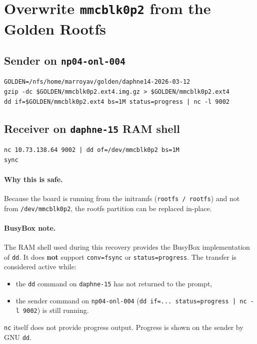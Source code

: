 \documentclass[a4paper,11pt]{article}
\begin{document}
\clearpage
\section{Overwrite \texttt{mmcblk0p2} from the Golden Rootfs}

\subsection*{Sender on \texttt{np04-onl-004}}
\begin{listing}[H]
\begin{verbatim}
GOLDEN=/nfs/home/marroyav/golden/daphne14-2026-03-12
gzip -dc $GOLDEN/mmcblk0p2.ext4.img.gz > $GOLDEN/mmcblk0p2.ext4
dd if=$GOLDEN/mmcblk0p2.ext4 bs=1M status=progress | nc -l 9002
\end{verbatim}
\caption{Serve the golden rootfs image}
\end{listing}

\subsection*{Receiver on \texttt{daphne-15} RAM shell}
\begin{listing}[H]
\begin{verbatim}
nc 10.73.138.64 9002 | dd of=/dev/mmcblk0p2 bs=1M
sync
\end{verbatim}
\caption{Overwrite the eMMC rootfs partition}
\end{listing}

\paragraph{Why this is safe.}
Because the board is running from the initramfs (\texttt{rootfs / rootfs}) and
not from \texttt{/dev/mmcblk0p2}, the rootfs partition can be replaced in-place.

\paragraph{BusyBox note.}
The RAM shell used during this recovery provides the BusyBox implementation of
\texttt{dd}. It does \textbf{not} support \texttt{conv=fsync} or
\texttt{status=progress}. The transfer is considered active while:
\begin{itemize}
  \item the \texttt{dd} command on \texttt{daphne-15} has not returned to the prompt,
  \item the sender command on \texttt{np04-onl-004}
        (\texttt{dd if=... status=progress | nc -l 9002})
        is still running.
\end{itemize}
\texttt{nc} itself does not provide progress output. Progress is shown on the
sender by GNU \texttt{dd}.
\end{document}
